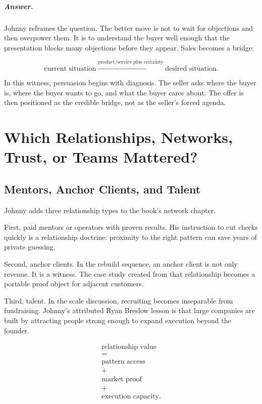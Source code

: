 \documentclass[11pt,oneside]{book}
\begin{document}
\paragraph{Answer.}
Johnny reframes the question. The better move is not to wait for objections and then overpower them. It is to understand the buyer well enough that the presentation blocks many objections before they appear. Sales becomes a bridge:

\begin{equation}
\text{current situation}
\xrightarrow{\text{product/service plus certainty}}
\text{desired situation}.
\end{equation}

In this witness, persuasion begins with diagnosis. The seller asks where the buyer is, where the buyer wants to go, and what the buyer cares about. The offer is then positioned as the credible bridge, not as the seller's forced agenda.

\chapter{Which Relationships, Networks, Trust, or Teams Mattered?}

\section{Mentors, Anchor Clients, and Talent}

Johnny adds three relationship types to the book's network chapter.

First, paid mentors or operators with proven results. His instruction to cut checks quickly is a relationship doctrine: proximity to the right pattern can save years of private guessing.

Second, anchor clients. In the rebuild sequence, an anchor client is not only revenue. It is a witness. The case study created from that relationship becomes a portable proof object for adjacent customers.

Third, talent. In the scale discussion, recruiting becomes inseparable from fundraising. Johnny's attributed Ryan Breslow lesson is that large companies are built by attracting people strong enough to expand execution beyond the founder.

\begin{equation}
\begin{gathered}
\text{relationship value}\\
=\\
\text{pattern access}\\
+\\
\text{market proof}\\
+\\
\text{execution capacity}.
\end{gathered}
\end{equation}
\end{document}

